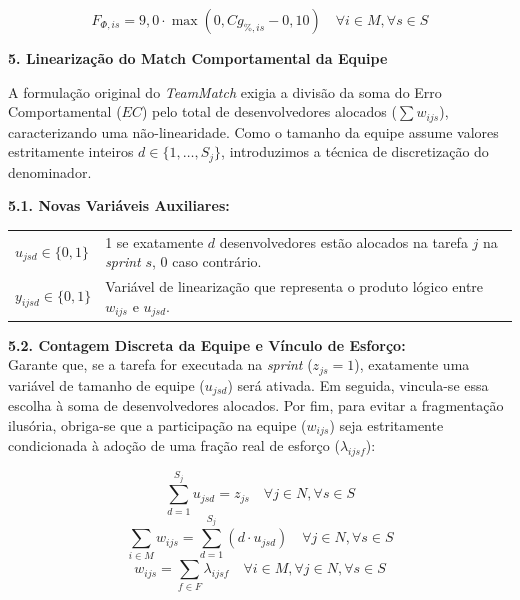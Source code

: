 \documentclass[a4paper,11pt]{article}
\begin{document}
\begin{equation}
    F_{\Phi, is} = 9,0 \cdot \max(0, Cg_{\%, is} - 0,10) \quad \forall i \in M, \forall s \in S
\end{equation}

\vspace{0.2cm}
\noindent\textbf{5. Linearização do Match Comportamental da Equipe}

A formulação original do \textit{TeamMatch} exigia a divisão da soma do Erro 
Comportamental ($EC$) pelo total de desenvolvedores alocados ($\sum w_{ijs}$), 
caracterizando uma não-linearidade. Como o tamanho da equipe assume valores 
estritamente inteiros $d \in \{1, \dots, S_j\}$, introduzimos a técnica de discretização do denominador.

\vspace{0.2cm}
\noindent\textbf{5.1. Novas Variáveis Auxiliares:}
\begin{center}
    \begin{tabular}{p{2.5cm} p{12cm}}
        $u_{jsd} \in \{0, 1\}$ & 1 se exatamente $d$ desenvolvedores estão alocados na tarefa $j$ 
        na \textit{sprint} $s$, 0 caso contrário. \\
        $y_{ijsd} \in \{0, 1\}$ & Variável de linearização que representa o produto lógico 
        entre $w_{ijs}$ e $u_{jsd}$.
    \end{tabular}
\end{center}

\vspace{0.2cm}
\noindent\textbf{5.2. Contagem Discreta da Equipe e Vínculo de Esforço:} \\
Garante que, se a tarefa for executada na \textit{sprint} ($z_{js}=1$), exatamente uma variável de tamanho de equipe ($u_{jsd}$) será ativada. Em seguida, vincula-se essa escolha à soma de desenvolvedores alocados. Por fim, para evitar a fragmentação ilusória, obriga-se que a participação na equipe ($w_{ijs}$) seja estritamente condicionada à adoção de uma fração real de esforço ($\lambda_{ijsf}$):

\begin{equation}
    \sum_{d=1}^{S_j} u_{jsd} = z_{js} \quad \forall j \in N, \forall s \in S
\end{equation}
\begin{equation}
    \sum_{i \in M} w_{ijs} = \sum_{d=1}^{S_j} (d \cdot u_{jsd}) \quad \forall j \in N, \forall s \in S
\end{equation}
\begin{equation}
    w_{ijs} = \sum_{f \in F} \lambda_{ijsf} \quad \forall i \in M, \forall j \in N, \forall s \in S
\end{equation}
\end{document}
